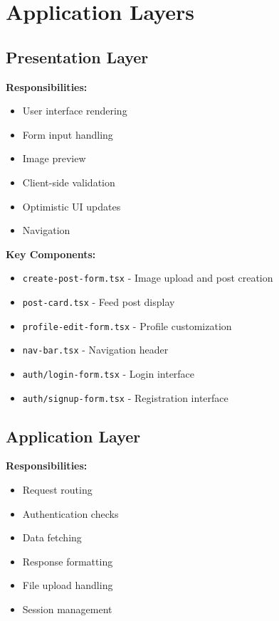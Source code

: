 \documentclass[12pt,a4paper]{report}
\begin{document}
\section{Application Layers}

\subsection{Presentation Layer}

\textbf{Responsibilities:}
\begin{itemize}
    \item User interface rendering
    \item Form input handling
    \item Image preview
    \item Client-side validation
    \item Optimistic UI updates
    \item Navigation
\end{itemize}

\textbf{Key Components:}
\begin{itemize}
    \item \texttt{create-post-form.tsx} - Image upload and post creation
    \item \texttt{post-card.tsx} - Feed post display
    \item \texttt{profile-edit-form.tsx} - Profile customization
    \item \texttt{nav-bar.tsx} - Navigation header
    \item \texttt{auth/login-form.tsx} - Login interface
    \item \texttt{auth/signup-form.tsx} - Registration interface
\end{itemize}

\subsection{Application Layer}

\textbf{Responsibilities:}
\begin{itemize}
    \item Request routing
    \item Authentication checks
    \item Data fetching
    \item Response formatting
    \item File upload handling
    \item Session management
\end{itemize}
\end{document}
